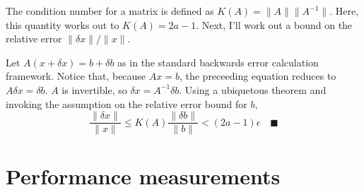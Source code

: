 \documentclass[12pt,fleqn,leqno,letterpaper]{article}
\begin{document}
The condition number for a matrix is defined as $K(A) = \|A\| \|A^{-1}\|$. Here,
this quantity works out to $K(A)=2a-1$. Next, I'll work out a bound on the
relative error $\|\delta x\|/\|x\|$.

Let $A(x + \delta x) = b + \delta b$ as in the standard backwards error
calculation framework. Notice that, because $Ax=b$, the preceeding equation
reduces to $A\delta x = \delta b$. $A$ is invertible, so
$\delta x = A^{-1}\delta b$. Using a ubiquetous theorem and invoking the
assumption on the relative error bound for $b$,
$$
\frac{\|\delta x\|}{\|x\|} \le K(A) \frac{\|\delta b\|}{\|b\|} < (2a-1)\epsilon
\quad\blacksquare
$$

\section{Performance measurements}


% 
\end{document}
